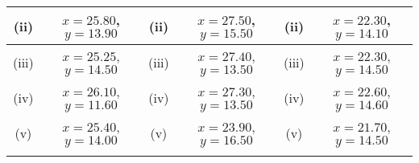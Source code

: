 \begin{tabular}{||c|c||c|c||c|c||}
					\hline (ii)  & $x= 25.80$, $y = 13.90$  & (ii) & $x= 27.50 $, $y= 15.50$ & (ii) & $x= 22.30$, $y = 14.10$ \\  \hline
					\hline (iii) & $x= 25.25$, $y= 14.50 $   & (iii) & $x= 27.40$, $y= 13.50$ &(iii) & $x= 22.30$, $y= 14.50$ \\  \hline
					\hline (iv)  & $x= 26.10$, $y = 11.60$  & (iv) & $x= 27.30$, $y= 13.50$ & (iv)  & $x= 22.60 $, $y = 14.60$\\  \hline
					\hline (v) & $x= 25.40$, $y = 14.00$ & (v)  & $x= 23.90$, $y = 16.50 $ & (v) & $x= 21.70$, $y= 14.50$\\  \hline
					\hline 
					& & & & & \\ \hline
				\end{tabular} 
			